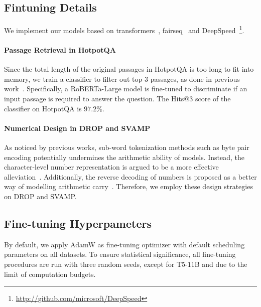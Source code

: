 \subsection{Fintuning Details}

We implement our models based on transformers~\cite{wolf-etal-2020-transformers}, fairseq~\cite{ott-etal-2019-fairseq} and DeepSpeed~\footnote{\url{http://github.com/microsoft/DeepSpeed}}.

\paragraph{Passage Retrieval in HotpotQA} Since the total length of the original passages in HotpotQA is too long to fit into memory, we train a classifier to filter out top-$3$ passages, as done in previous work~\citep{deng2021reasonbert}.
Specifically, a RoBERTa-Large model is fine-tuned to discriminate if an input passage is required to answer the question. 
The Hits@$3$ score of the classifier on HotpotQA is $97.2\%$.

\paragraph{Numerical Design in DROP and SVAMP}

As noticed by previous works, sub-word tokenization methods such as byte pair encoding \cite{DBLP:journals/corr/SennrichHB15} potentially undermines the arithmetic ability of models.
Instead, the character-level number representation is argued to be a more effective alleviation~\cite{wallace-etal-2019-nlp}.
Additionally, the reverse decoding of numbers is proposed as a better way of modelling arithmetic carry~\citep{geva-etal-2020-injecting}. 
Therefore, we employ these design strategies on DROP and SVAMP. 



\subsection{Fine-tuning Hyperpameters}

By default, we apply AdamW as fine-tuning optimizer with default scheduling parameters on all datasets. To ensure statistical significance, all fine-tuning procedures are run with three random seeds, except for T5-$11$B and \ourstfive due to the limit of computation budgets.

